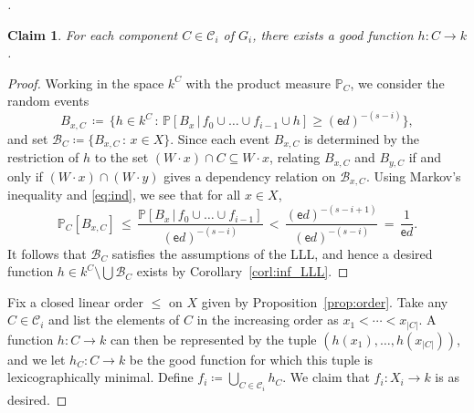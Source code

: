 \documentclass[11pt,reqno,psamsfonts]{amsart}
\theoremstyle{bfnote}
\newtheorem{claim}[theo]{Claim}
\theoremstyle{definition}
\theoremstyle{remark}
\newcommand*{\myproofname}{Proof}
\newenvironment{claimproof}[1][\myproofname]{\begin{proof}[#1]\renewcommand*{\qedsymbol}{\(\boxtimes\)}}{\end{proof}}
\renewcommand{\qedsymbol}{$\blacksquare$}
\newcommand{\0}{\varnothing}
\newcommand{\set}[1]{\{#1\}}
\renewcommand{\P}{\mathbb{P}}
\renewcommand{\leq}{\leqslant}
\renewcommand{\geq}{\geqslant}
\newcommand{\defeq}{\coloneqq}
\numberwithin{equation}{section}
\newenvironment{scproof}[1][]{\begin{proof}[\textsc{\upshape{Proof}}#1]}{\end{proof}}
\begin{document}
\begin{scproof}
        \begin{claim}
            For each component $C \in \mathcal{C}_i$ of $G_i$, there exists a good function $h \colon C \to k$. %
        \end{claim}
        \begin{claimproof}
            Working in the space $k^C$ with the product measure $\P_C$, we consider the random events
            \[
                B_{x,C} \,\defeq\, \big\{h \in k^C \,:\, \P[B_x \,\vert\, f_0 \cup \ldots \cup f_{i-1} \cup h] \geq (\mathsf{e}d)^{-(s-i)} \big\},
            \]
            and set $\mathcal{B}_{C} \defeq \set{B_{x,C} \,:\, x \in X}$. Since each event $B_{x,C}$ is determined by the restriction of $h$ to the set $(W \cdot x) \cap C \subseteq W \cdot x$, %
            relating $B_{x,C}$ and $B_{y,C}$ if and only if $(W \cdot x) \cap (W \cdot y)$ gives a dependency relation on $\mathcal{B}_{x,C}$. 
            Using Markov's inequality and \eqref{eq:ind}, we see that for all $x \in X$,
            \[
                \P_C[B_{x,C}] \,\leq\, \frac{\P[B_x \,\vert\, f_0 \cup \ldots \cup f_{i-1}]}{(\mathsf{e}d)^{-(s-i)}} \,<\, \frac{(\mathsf{e}d)^{-(s-i+1)}}{(\mathsf{e}d)^{-(s-i)}} \,=\, \frac{1}{\mathsf{e}d}.
            \]
            It follows that $\mathcal{B}_{C}$ satisfies the assumptions of the LLL, and hence a desired function $h \in k^C \setminus \bigcup \mathcal{B}_C$ exists by Corollary~\ref{corl:inf_LLL}.
        \end{claimproof}

        Fix a closed linear order $\leq$ on $X$ given by Proposition~\ref{prop:order}. Take any $C \in \mathcal{C}_i$ and list the elements of $C$ in the increasing order as $x_1 < \cdots < x_{|C|}$. A function $h \colon C \to k$ can then be represented by the tuple $(h(x_1), \ldots, h(x_{|C|}))$, and we let $h_C \colon C \to k$ be the good function %
        for which this tuple is lexicographically minimal. %
        Define
        $
            f_i \defeq \bigcup_{C \in \mathcal{C}_i} h_C
        $.
        We claim that $f_i \colon X_i \to k$ is as desired.
        

\end{scproof}
\end{document}
